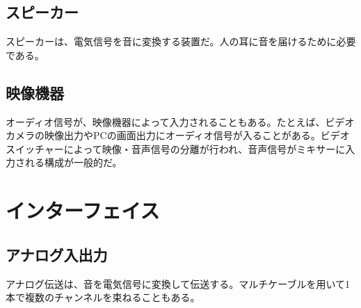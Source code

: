 
\subsection{スピーカー}

スピーカーは、電気信号を音に変換する装置だ。人の耳に音を届けるために必要である。


\subsection{映像機器}

オーディオ信号が、映像機器によって入力されることもある。たとえば、ビデオカメラの映像出力やPCの画面出力にオーディオ信号が入ることがある。ビデオスイッチャーによって映像・音声信号の分離が行われ、音声信号がミキサーに入力される構成が一般的だ。


\section{インターフェイス}
\label{sec:interface}

\subsection{アナログ入出力}

アナログ伝送は、音を電気信号に変換して伝送する。マルチケーブルを用いて1本で複数のチャンネルを束ねることもある。

